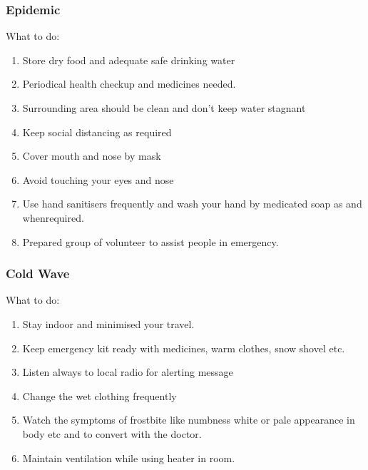 \documentclass[12pt,a4paper]{article}
\begin{document}
\subsubsection*{Epidemic}
What to do:
\begin{enumerate}
	\item Store dry food and adequate safe drinking water
	\item Periodical health checkup and medicines needed.
	\item Surrounding area should be clean and don't keep water stagnant
	\item Keep social distancing as required
	\item Cover mouth and nose by mask
	\item Avoid touching your eyes and nose
	\item Use hand sanitisers frequently and wash your hand by medicated soap as and whenrequired.
	\item Prepared group of volunteer to assist people in emergency.
\end{enumerate}
\subsubsection*{Cold Wave}
What to do:
\begin{enumerate}
	\item Stay indoor and minimised your travel.
	\item Keep emergency kit ready with medicines, warm clothes, snow shovel etc.
	\item Listen always to local radio for alerting message
	\item Change the wet clothing frequently 
	\item Watch the symptoms of frostbite like numbness white or pale appearance in body etc and to convert with the doctor.
	\item Maintain ventilation while using heater in room.
\end{enumerate}







  
\end{document}
